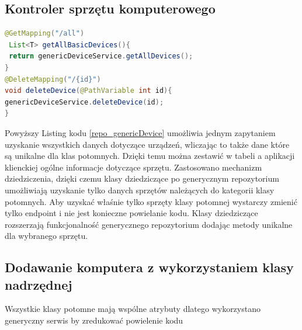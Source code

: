 \subsection{Kontroler sprzętu komputerowego}

\begin{lstlisting}[language=Java, style=JavaStyle,  caption={Wybrane metody generycznego kontrolera sprzętu komputerowego}, label={controller_genericDevice}]
@GetMapping("/all")
 List<T> getAllBasicDevices(){
 return genericDeviceService.getAllDevices();
} 
@DeleteMapping("/{id}")
void deleteDevice(@PathVariable int id){
genericDeviceService.deleteDevice(id);
}
\end{lstlisting}

Powyższy Listing kodu \ref{repo_genericDevice} umożliwia jednym zapytaniem uzyskanie wszystkich danych dotyczące urządzeń, wliczając to także dane które są unikalne dla klas potomnych. Dzięki temu można zestawić w tabeli a aplikacji klienckiej ogólne informacje dotyczące sprzętu. Zastosowano mechanizm dziedziczenia, dzięki czemu klasy dziedziczące po generycznym repozytorium umożliwiają uzyskanie tylko danych sprzętów należących do kategorii klasy potomnych. Aby uzyskać właśnie tylko sprzęty klasy potomnej wystarczy zmienić tylko endpoint i nie jest konieczne powielanie kodu. Klasy dziedziczące rozszerzają funkcjonalność generycznego repozytorium dodając metody unikalne dla wybranego sprzętu.

\subsection{Dodawanie komputera z wykorzystaniem klasy nadrzędnej}
Wszystkie klasy potomne mają wspólne atrybuty dlatego wykorzystano generyczny serwis by zredukować powielenie kodu


